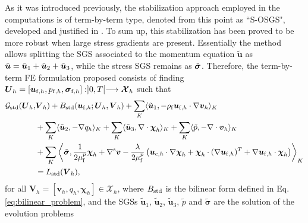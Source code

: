 \documentclass[11pt,english]{article}
\def\ufluidh{\boldsymbol{u}_{{\rm{f}},h}}
\def\pfluidh{p_{{\rm{f}},h}}
\def\viscp{\mu^{p}_{\rm{f}}}
\def\alevelocityh{\boldsymbol{u}_{\mathrm{c},h}}
\begin{document}
As it was introduced previously, the stabilization approach employed in the computations is of term-by-term type, denoted from this point as ``S-OSGS", developed and justified in \cite{moreno2020solution}. To sum up, this stabilization has been proved to be more robust when large stress gradients are present. Essentially the method allows splitting the SGS associated to the momentum equation $\tilde{\boldsymbol{u}}$ as $\tilde{\text{\ensuremath{\boldsymbol{u}}}}=\tilde{\boldsymbol{u}}_{1}+\tilde{\boldsymbol{u}}_{2}+\tilde{\boldsymbol{u}}_{3}$, while the stress SGS remains as $\tilde{\text{\ensuremath{\boldsymbol{\sigma}}}}$. Therefore, the term-by-term FE formulation proposed consists of finding $\boldsymbol{U}_{h}=[\ufluidh,\pfluidh,\boldsymbol{\sigma}_{{\rm{f}},h}]:]0,T[\longrightarrow\boldsymbol{\mathcal{X}}_{h}$ such that 
\begin{align*}
    \mathcal{G}_{\text{std}}(\boldsymbol{U}_{h}, & \boldsymbol{V}_{h})+B_{\text{std}}(\ufluidh;\boldsymbol{U}_{h},\boldsymbol{V}_{h})+\sum_{K}\langle\tilde{\boldsymbol{u}}_{1},-\rho_{\rm{f}}\ufluidh\cdot\nabla\boldsymbol{v}_{h}\rangle_{K}\\
     & +\sum_{K}\langle\tilde{\boldsymbol{u}}_{2},-\nabla q_{h}\rangle_{K}+\sum_{K}\langle\tilde{\boldsymbol{u}}_{3},\nabla\cdot\boldsymbol{\chi}_{h}\rangle_{K}+\sum_{K}\langle\tilde{p},-\nabla\cdot\boldsymbol{v}_{h}\rangle_{K}\\
     & +\sum_{K}\left\langle \tilde{\boldsymbol{\sigma}},\dfrac{1}{2\viscp}\boldsymbol{\chi}_{h}+\nabla^{\rm s}\boldsymbol{v}-\dfrac{\lambda}{2\viscp}\left(\alevelocityh\cdot\nabla\boldsymbol{\chi}_{h}+\boldsymbol{\chi}_{h}\cdot(\nabla\ufluidh)^{T}+\nabla\ufluidh\cdot\boldsymbol{\chi}_{h}\right)\right\rangle _{K}\\
     & =L_{\rm std}(\boldsymbol{V}_{h}),
\end{align*}
for all $\boldsymbol{V}_{h}=[\boldsymbol{v}_{h},q_{h},\boldsymbol{\chi}_{h}]\in\boldsymbol{\mathcal{X}}_{h}$, where $B_{\text{\text{std}}}$ is the bilinear form defined in Eq.\eqref{eq:bilinear_problem}, and the SGSs $\tilde{\boldsymbol{u}}_{1}$, $\tilde{\boldsymbol{u}}_{2}$, $\tilde{\boldsymbol{u}}_{3}$, $\tilde{p}$ and $\tilde{\boldsymbol{\sigma}}$ are the solution of the evolution problems
\end{document}
